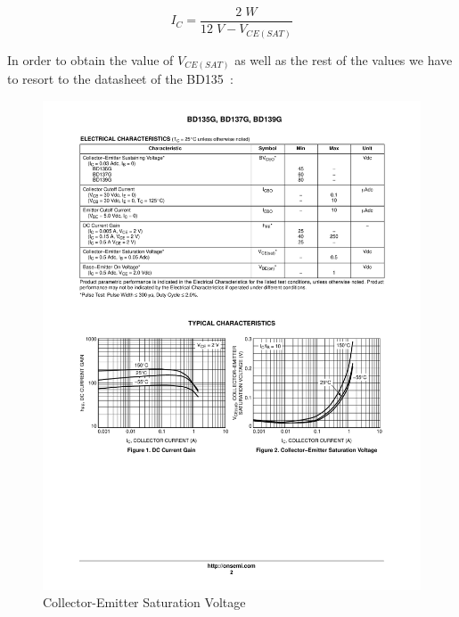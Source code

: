 \begin{equation*}
    I_C = \frac{2 \; W}{12 \; V - V_{CE(SAT)}}
\end{equation*}

\clearpage

In order to obtain the value of $V_{CE(SAT)}$ as well as the rest of the values we have to resort to the datasheet of the BD135~\autocite{BD135}:

\begin{figure}[H]
    \centering
    \includegraphics[]{Graphics/VHDL/Practice 8/BJT/DATASHEET/VCE-IC.pdf}
    \caption{Collector-Emitter Saturation Voltage~\autocite{BD135}}
    \label{fig:VCE_SAT}
\end{figure}


